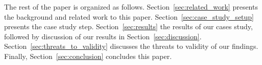 



	

The rest of the paper is organized as follows. Section~\ref{sec:related_work} presents the background and related work to this paper. Section~\ref{sec:case_study_setup} presents the case study step. Section~\ref{sec:results} the results of our cases study, followed by discussion of our results in Section~\ref{sec:discussion}. Section~\ref{sec:threats_to_validity} discusses the threats to validity of our findings. Finally, Section~\ref{sec:conclusion} concludes this paper.
